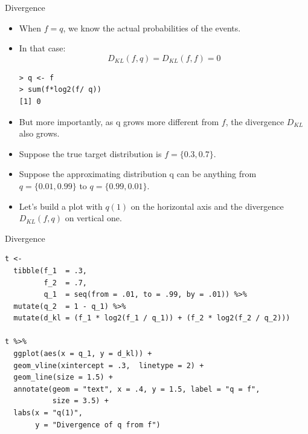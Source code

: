 \documentclass[handout]{beamer}
\begin{document}
\begin{frame}[fragile]{Divergence}
\scriptsize{

\begin{itemize}

\item  When $f = q$, we know the actual probabilities of the events. 

\item In that case: \begin{displaymath}
                     D_{KL}(f,q) =   D_{KL}(f,f) = 0
                    \end{displaymath}


\begin{verbatim}
> q <- f
> sum(f*log2(f/ q)) 
[1] 0
\end{verbatim}
                    
\item But more importantly, as q grows more different from $f$, the divergence $D_{KL}$ also grows.       
       
\item Suppose the true target distribution is $f = \{0.3, 0.7\}$.

\item Suppose the approximating distribution q can be anything from $q = \{0.01, 0.99\}$ to $q = \{0.99, 0.01\}$.       
       
\item Let's build a plot with $q(1)$ on the horizontal axis and the divergence $D_{KL}(f, q)$ on vertical one.       
       
\end{itemize}


} 
\end{frame}

\begin{frame}[fragile]{Divergence}
\scriptsize{

\begin{verbatim}
t <- 
  tibble(f_1  = .3,
         f_2  = .7,
         q_1  = seq(from = .01, to = .99, by = .01)) %>% 
  mutate(q_2  = 1 - q_1) %>%
  mutate(d_kl = (f_1 * log2(f_1 / q_1)) + (f_2 * log2(f_2 / q_2)))

t %>% 
  ggplot(aes(x = q_1, y = d_kl)) +
  geom_vline(xintercept = .3,  linetype = 2) +
  geom_line(size = 1.5) +
  annotate(geom = "text", x = .4, y = 1.5, label = "q = f", 
           size = 3.5) +
  labs(x = "q(1)",
       y = "Divergence of q from f") 
\end{verbatim}



} 
\end{frame}
\end{document}
